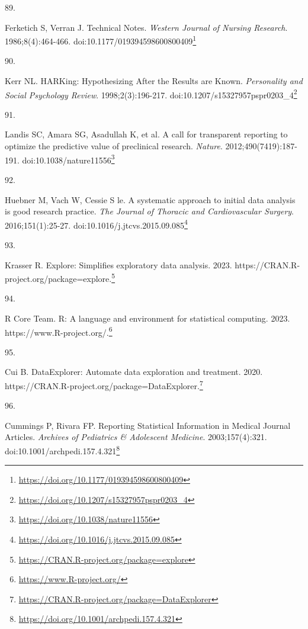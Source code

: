 \documentclass[
  a4paper,
]{book}
\newlength{\cslhangindent}
\newlength{\csllabelwidth}
\newlength{\cslentryspacingunit} %
\newenvironment{CSLReferences}[2] %
 {%
  \setlength{\parindent}{0pt}
  \ifodd #1
  \let\oldpar\par
  \def\par{\hangindent=\cslhangindent\oldpar}
  \fi
  \setlength{\parskip}{#2\cslentryspacingunit}
 }%
 {}
\newcommand{\CSLLeftMargin}[1]{\parbox[t]{\csllabelwidth}{#1}}
\newcommand{\CSLRightInline}[1]{\parbox[t]{\linewidth - \csllabelwidth}{#1}\break}
\renewcommand{\href}[2]{#2\footnote{\url{#1}}}
\begin{document}
\begin{CSLReferences}{0}{0}
\leavevmode{}%
\CSLLeftMargin{89. }%
\CSLRightInline{Ferketich S, Verran J. Technical Notes. \emph{Western Journal of Nursing Research}. 1986;8(4):464-466. doi:\href{https://doi.org/10.1177/019394598600800409}{10.1177/019394598600800409}}

\leavevmode{}%
\CSLLeftMargin{90. }%
\CSLRightInline{Kerr NL. HARKing: Hypothesizing After the Results are Known. \emph{Personality and Social Psychology Review}. 1998;2(3):196-217. doi:\href{https://doi.org/10.1207/s15327957pspr0203_4}{10.1207/s15327957pspr0203\_4}}

\leavevmode{}%
\CSLLeftMargin{91. }%
\CSLRightInline{Landis SC, Amara SG, Asadullah K, et al. A call for transparent reporting to optimize the predictive value of preclinical research. \emph{Nature}. 2012;490(7419):187-191. doi:\href{https://doi.org/10.1038/nature11556}{10.1038/nature11556}}

\leavevmode{}%
\CSLLeftMargin{92. }%
\CSLRightInline{Huebner M, Vach W, Cessie S le. A systematic approach to initial data analysis is good research practice. \emph{The Journal of Thoracic and Cardiovascular Surgery}. 2016;151(1):25-27. doi:\href{https://doi.org/10.1016/j.jtcvs.2015.09.085}{10.1016/j.jtcvs.2015.09.085}}

\leavevmode{}%
\CSLLeftMargin{93. }%
\CSLRightInline{Krasser R. Explore: Simplifies exploratory data analysis. 2023. \href{https://CRAN.R-project.org/package=explore}{https://CRAN.R-project.org/package=explore.}}

\leavevmode{}%
\CSLLeftMargin{94. }%
\CSLRightInline{R Core Team. R: A language and environment for statistical computing. 2023. \href{https://www.R-project.org/}{https://www.R-project.org/.}}

\leavevmode{}%
\CSLLeftMargin{95. }%
\CSLRightInline{Cui B. DataExplorer: Automate data exploration and treatment. 2020. \href{https://CRAN.R-project.org/package=DataExplorer}{https://CRAN.R-project.org/package=DataExplorer.}}

\leavevmode{}%
\CSLLeftMargin{96. }%
\CSLRightInline{Cummings P, Rivara FP. Reporting Statistical Information in Medical Journal Articles. \emph{Archives of Pediatrics \& Adolescent Medicine}. 2003;157(4):321. doi:\href{https://doi.org/10.1001/archpedi.157.4.321}{10.1001/archpedi.157.4.321}}


\end{CSLReferences}
\end{document}
